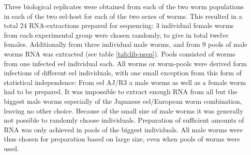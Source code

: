Three biological replicates were obtained from each of the two worm
populations in each of the two eel-host for each of the two sexes of
worms. This resulted in a total 24 RNA-extractions prepared for
sequencing: 3 individual female worms from each experimental group
were chosen randomly, to give in total twelve females. Additionally
from three individual male worms, and from 9 pools of male worms RNA
was extracted (see table \ref{tab:lib-prep}). Pools consisted of worms
from one infected eel individual each. All worms or worm-pools were
derived form infections of different eel individuals, with one small
exception from this form of statistical independence: From eel AJ/R3 a
male worms as well as a female worm had to be prepared. It was
impossible to extract enough RNA from all but the biggest male worms
especially of the Japanese eel/European worm combination, leaving no
other choice. Because of the small size of male worms it was generally
not possible to randomly choose individuals. Preparation of sufficient
amounts of RNA was only achieved in pools of the biggest
individuals. All male worms were thus chosen for preparation based on
large size, even when pools of worms were used.

